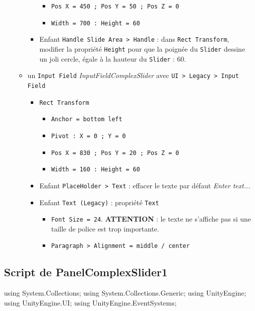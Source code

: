 \documentclass[a4paper,10pt]{article}
\newenvironment{solution}%
{\begin{tcolorbox}[breakable,colback=red!5!white,colframe=red!75!black,title=Solution]}%
{\end{tcolorbox}}
\newenvironment{boxcode}%
{\begin{tcolorbox}[breakable,colback=gray!5!white,colframe=black]}%
	{\end{tcolorbox}}
\begin{document}
\begin{solution}
\begin{itemize}
\begin{itemize}
\begin{itemize}
\begin{itemize}
				\item \texttt{Pos X = 450 ; Pos Y = 50 ; Pos Z = 0}
				\item \texttt{Width = 700 : Height = 60}				
			\end{itemize}
			\item Enfant \texttt{Handle Slide Area > Handle} : dans \texttt{Rect Transform}, modifier la propriété \texttt{Height} pour que la poignée du \texttt{Slider} dessine un joli cercle, égale à la hauteur du \texttt{Slider} : $60$.
		\end{itemize}
		\item un \texttt{Input Field} \textit{InputFieldComplexSlider} avec \texttt{UI > Legacy > Input Field}
		\begin{itemize}
			\item \texttt{Rect Transform}
			\begin{itemize}
				\item \texttt{Anchor = bottom left}
				\item \texttt{Pivot : X = 0 ; Y = 0}
				\item \texttt{Pos X = 830 ; Pos Y = 20 ; Pos Z = 0}
				\item \texttt{Width = 160 : Height = 60}				
			\end{itemize}
			\item Enfant \texttt{PlaceHolder > Text} : effacer le texte par défaut \textit{Enter text...}
			\item Enfant \texttt{Text (Legacy)} : propriété \texttt{Text}
			\begin{itemize}
				\item \texttt{Font Size = 24}. \textbf{ATTENTION} : le texte ne s'affiche pas si une taille de police est trop importante.
				\item \texttt{Paragraph > Alignment = middle / center}
			\end{itemize}
		\end{itemize}
	\end{itemize}
	
\end{itemize}

\subsection{Script de PanelComplexSlider1}

\begin{boxcode}
\begin{csharpsansbord}
using System.Collections;
using System.Collections.Generic;
using UnityEngine;
using UnityEngine.UI;
using UnityEngine.EventSystems;


\end{csharpsansbord}
\end{boxcode}
\end{solution}
\end{document}
